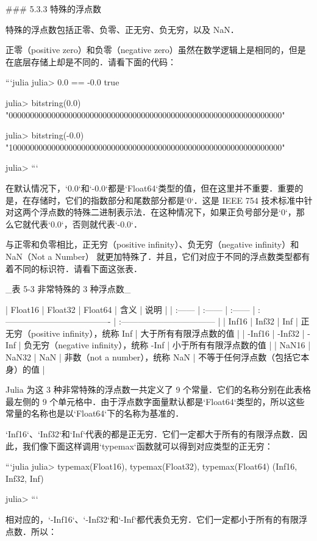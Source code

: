 ### 5.3.3 特殊的浮点数

特殊的浮点数包括正零、负零、正无穷、负无穷，以及 NaN．

正零（positive zero）和负零（negative zero）虽然在数学逻辑上是相同的，但是在底层存储上却是不同的．请看下面的代码：

```julia
julia> 0.0 == -0.0 
true

julia> bitstring(0.0)
"0000000000000000000000000000000000000000000000000000000000000000"

julia> bitstring(-0.0)
"1000000000000000000000000000000000000000000000000000000000000000"

julia> 
```

在默认情况下，`0.0`和`-0.0`都是`Float64`类型的值，但在这里并不重要．重要的是，在存储时，它们的指数部分和尾数部分都是`0`．这是 IEEE 754 技术标准中针对这两个浮点数的特殊二进制表示法．在这种情况下，如果正负号部分是`0`，那么它就代表`0.0`，否则就代表`-0.0`．

与正零和负零相比，正无穷（positive infinity）、负无穷（negative infinity）和 NaN（Not a Number） 就更加特殊了．并且，它们对应于不同的浮点数类型都有着不同的标识符．请看下面这张表．

_表 5-3 非常特殊的 3 种浮点数_

| Float16 | Float32 | Float64 | 含义                                   | 说明                               |
| :------ | :------ | :------ | :------------------------------------- | :--------------------------------- |
| Inf16   | Inf32   | Inf     | 正无穷（positive infinity），统称 Inf  | 大于所有有限浮点数的值             |
| -Inf16  | -Inf32  | -Inf    | 负无穷（negative infinity），统称 -Inf | 小于所有有限浮点数的值             |
| NaN16   | NaN32   | NaN     | 非数（not a number），统称 NaN         | 不等于任何浮点数（包括它本身）的值 |

Julia 为这 3 种非常特殊的浮点数一共定义了 9 个常量．它们的名称分别在此表格最左侧的 9 个单元格中．由于浮点数字面量默认都是`Float64`类型的，所以这些常量的名称也是以`Float64`下的名称为基准的．

`Inf16`、`Inf32`和`Inf`代表的都是正无穷．它们一定都大于所有的有限浮点数．因此，我们像下面这样调用`typemax`函数就可以得到对应类型的正无穷：

```julia
julia> typemax(Float16), typemax(Float32), typemax(Float64)
(Inf16, Inf32, Inf)

julia> 
```

相对应的，`-Inf16`、`-Inf32`和`-Inf`都代表负无穷．它们一定都小于所有的有限浮点数．所以：

